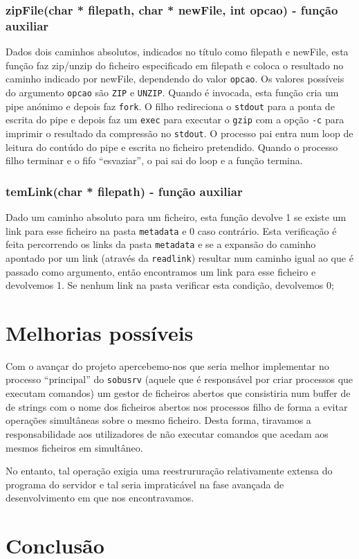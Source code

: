 \documentclass[a4paper,12pt,titlepage,portuguese]{article}
\begin{document}
\subsubsection{ zipFile(char * filepath, char * newFile, int opcao) - função auxiliar}

Dados dois caminhos absolutos, indicados no título como filepath e newFile, esta função faz zip/unzip do ficheiro especificado em filepath e coloca o resultado no caminho indicado por newFile, dependendo do valor \texttt{opcao}. Os valores possíveis do argumento \texttt{opcao} são \texttt{ZIP} e \texttt{UNZIP}. Quando é invocada, esta função cria um pipe anónimo e depois faz \texttt{fork}. O filho redireciona o \texttt{stdout} para a ponta de escrita do pipe e depois faz um \texttt{exec} para executar o \texttt{gzip} com a opção \texttt{-c} para imprimir o resultado da compressão no \texttt{stdout}. O processo pai entra num loop de leitura do contúdo do pipe e escrita no ficheiro pretendido. Quando o processo filho terminar e o fifo ``esvaziar'', o pai sai do loop e a função termina.

\subsubsection{ temLink(char * filepath) - função auxiliar}
Dado um caminho absoluto para um ficheiro, esta função devolve 1 se existe um link para esse ficheiro na pasta \texttt{metadata} e 0 caso contrário. Esta verificação é feita percorrendo os links da pasta \texttt{metadata} e se a expansão do caminho apontado por um link (através da \texttt{readlink}) resultar num caminho igual ao que é passado como argumento, então encontramos um link para esse ficheiro e devolvemos 1. Se nenhum link na pasta verificar esta condição, devolvemos 0;

\section{Melhorias possíveis}

Com o avançar do projeto apercebemo-nos que seria melhor implementar no processo ``principal'' do \texttt{sobusrv} 
(aquele que é responsável por criar processos que executam comandos) um gestor de ficheiros abertos que consistiria num buffer de de strings com o nome dos ficheiros abertos nos processos filho de forma a evitar operações simultâneas sobre o mesmo ficheiro. Desta forma, tiravamos a responsabilidade aos utilizadores de não executar comandos que acedam aos mesmos ficheiros em simultâneo.

No entanto, tal operação exigia uma reestrururação relativamente extensa do programa do servidor e tal seria impraticável na fase avançada de desenvolvimento em que nos encontravamos.

\section{Conclusão}
\end{document}
